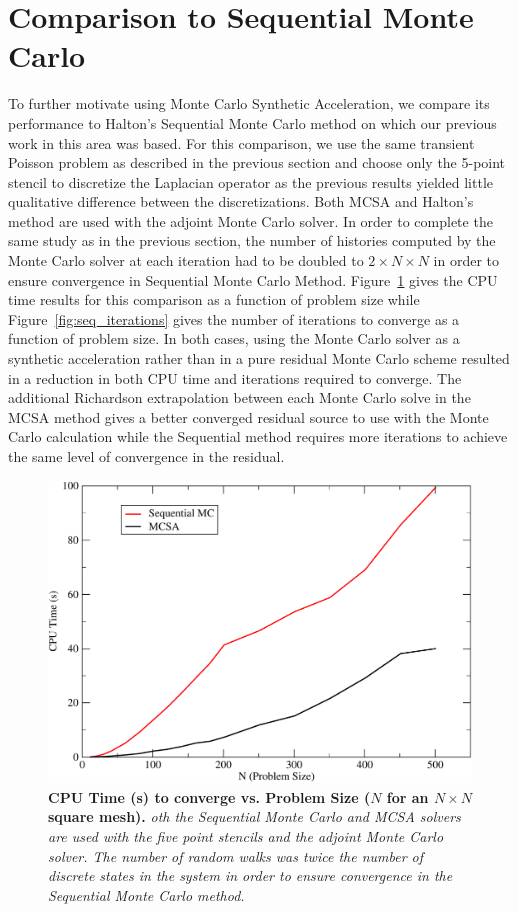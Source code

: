 \section{Comparison to Sequential Monte Carlo}
\label{subsec:sequential_comparison}
To further motivate using Monte Carlo Synthetic Acceleration, we
compare its performance to Halton's Sequential Monte Carlo method on
which our previous work in this area was based. For this comparison,
we use the same transient Poisson problem as described in the previous
section and choose only the 5-point stencil to discretize the
Laplacian operator as the previous results yielded little qualitative
difference between the discretizations. Both MCSA and Halton's method
are used with the adjoint Monte Carlo solver. In order to complete the
same study as in the previous section, the number of histories
computed by the Monte Carlo solver at each iteration had to be doubled
to $2 \times N \times N$ in order to ensure convergence in Sequential
Monte Carlo Method. Figure~\ref{fig:seq_cpu_time} gives the CPU time
results for this comparison as a function of problem size while
Figure~\ref{fig:seq_iterations} gives the number of iterations to
converge as a function of problem size. In both cases, using the Monte
Carlo solver as a synthetic acceleration rather than in a pure
residual Monte Carlo scheme resulted in a reduction in both CPU time
and iterations required to converge. The additional Richardson
extrapolation between each Monte Carlo solve in the MCSA method gives
a better converged residual source to use with the Monte Carlo
calculation while the Sequential method requires more iterations to
achieve the same level of convergence in the residual.

\begin{figure}[ht!]
  \centering
  \includegraphics[width=5in,clip]{chapters/mc_background/seq_cpu.pdf}
  \caption{\textbf{CPU Time (s) to converge vs. Problem Size ($N$ for
      an $N \times N$ square mesh).} \textit{oth the Sequential Monte
      Carlo and MCSA solvers are used with the five point stencils and
      the adjoint Monte Carlo solver. The number of random walks was
      twice the number of discrete states in the system in order to
      ensure convergence in the Sequential Monte Carlo method.}}
  \label{fig:seq_cpu_time}
\end{figure}

